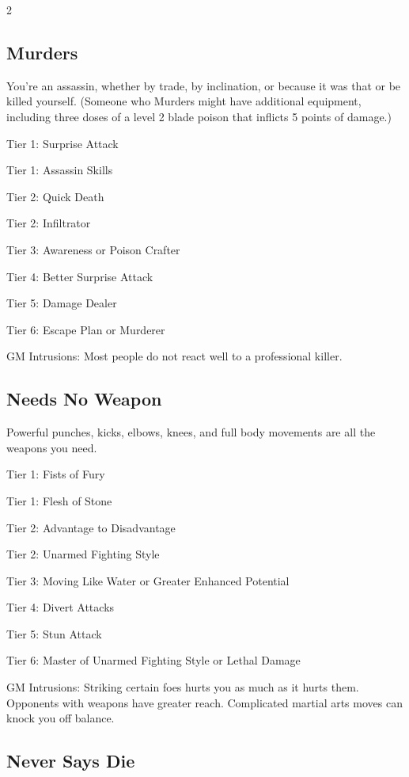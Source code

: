 \begin{multicols}{2}
\subsection{Murders}

You’re an assassin, whether by trade, by inclination, or because it was that or be killed yourself. (Someone who Murders might have additional equipment, including three doses of a level 2 blade poison that inflicts 5 points of damage.)

Tier 1: Surprise Attack

Tier 1: Assassin Skills

Tier 2: Quick Death

Tier 2: Infiltrator

Tier 3: Awareness or Poison Crafter

Tier 4: Better Surprise Attack

Tier 5: Damage Dealer

Tier 6: Escape Plan or Murderer

GM Intrusions: Most people do not react well to a professional killer.

\subsection{Needs No Weapon}

Powerful punches, kicks, elbows, knees, and full body movements are all the weapons you need.

Tier 1: Fists of Fury

Tier 1: Flesh of Stone

Tier 2: Advantage to Disadvantage

Tier 2: Unarmed Fighting Style

Tier 3: Moving Like Water or Greater Enhanced Potential

Tier 4: Divert Attacks

Tier 5: Stun Attack

Tier 6: Master of Unarmed Fighting Style or Lethal Damage

GM Intrusions: Striking certain foes hurts you as much as it hurts them. Opponents with weapons have greater reach. Complicated martial arts moves can knock you off balance.

\subsection{Never Says Die}


\end{multicols}
